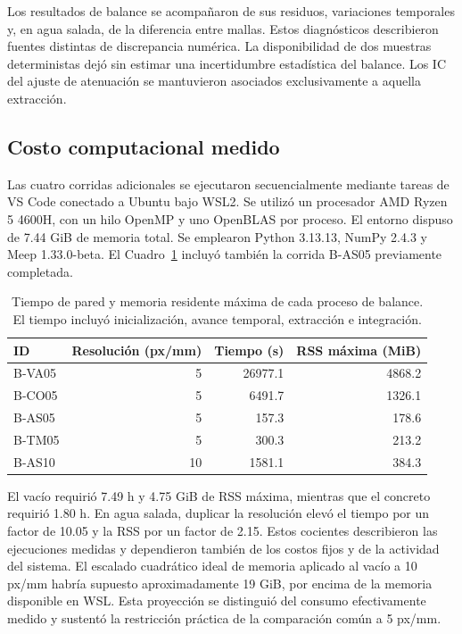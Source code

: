 Los resultados de balance se acompañaron de sus residuos, variaciones temporales y, en agua salada, de la diferencia entre mallas. Estos diagnósticos describieron fuentes distintas de discrepancia numérica. La disponibilidad de dos muestras deterministas dejó sin estimar una incertidumbre estadística del balance. Los IC del ajuste de atenuación se mantuvieron asociados exclusivamente a aquella extracción.

\clearpage
\subsection{Costo computacional medido}\label{sec:costo-balance}
Las cuatro corridas adicionales se ejecutaron secuencialmente mediante tareas de VS Code conectado a Ubuntu bajo WSL2. Se utilizó un procesador AMD Ryzen 5 4600H, con un hilo OpenMP y uno OpenBLAS por proceso. El entorno dispuso de 7.44 GiB de memoria total. Se emplearon Python 3.13.13, NumPy 2.4.3 y Meep 1.33.0-beta. El Cuadro~\ref{tab:balance-costo} incluyó también la corrida B-AS05 previamente completada.

\begin{table}[htbp]\centering\small
\caption{Tiempo de pared y memoria residente máxima de cada proceso de balance. El tiempo incluyó inicialización, avance temporal, extracción e integración.}\label{tab:balance-costo}
\begin{tabular}{lrrr}\hline
ID & Resolución (px/mm) & Tiempo (s) & RSS máxima (MiB) \\ \hline
B-VA05 & 5 & 26977.1 & 4868.2 \\
B-CO05 & 5 & 6491.7 & 1326.1 \\
B-AS05 & 5 & 157.3 & 178.6 \\
B-TM05 & 5 & 300.3 & 213.2 \\
B-AS10 & 10 & 1581.1 & 384.3 \\ \hline
\end{tabular}\end{table}

El vacío requirió 7.49 h y 4.75 GiB de RSS máxima, mientras que el concreto requirió 1.80 h. En agua salada, duplicar la resolución elevó el tiempo por un factor de 10.05 y la RSS por un factor de 2.15. Estos cocientes describieron las ejecuciones medidas y dependieron también de los costos fijos y de la actividad del sistema. El escalado cuadrático ideal de memoria aplicado al vacío a 10 px/mm habría supuesto aproximadamente 19 GiB, por encima de la memoria disponible en WSL. Esta proyección se distinguió del consumo efectivamente medido y sustentó la restricción práctica de la comparación común a 5 px/mm.


